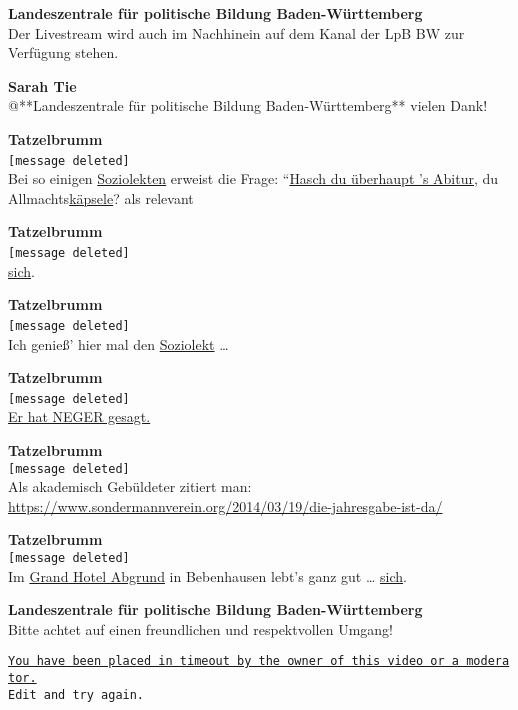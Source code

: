 \documentclass[]{article}
\begin{document}
\textbf{Landeszentrale für politische Bildung Baden-Württemberg}\\
​Der Livestream wird auch im Nachhinein auf dem Kanal der LpB BW zur
Verfügung stehen.

\textbf{Sarah Tie}\\
​@**Landeszentrale für politische Bildung Baden-Württemberg** vielen
Dank!

\textbf{Tatzelbrumm}\\
​\texttt{{[}message\ deleted{]}}\\
​Bei so einigen \protect\hyperlink{Soziolekt}{Soziolekten} erweist die
Frage: ``\protect\hyperlink{Saudaemliche-Details}{Hasch du überhaupt 's
Abitur}, du Allmachts\protect\hyperlink{Kaepsele}{käpsele}? als relevant

\textbf{Tatzelbrumm}\\
​\texttt{{[}message\ deleted{]}}\\
​\protect\hyperlink{Das-postponierte-Reflexivum}{sich}.

\textbf{Tatzelbrumm}\\
​\texttt{{[}message\ deleted{]}}\\
​Ich genieß' hier mal den \protect\hyperlink{Soziolekt}{Soziolekt}
\ldots{}

\textbf{Tatzelbrumm}\\
​\texttt{{[}message\ deleted{]}}\\
​\protect\hyperlink{Neger}{Er hat NEGER gesagt.}

\textbf{Tatzelbrumm}\\
\texttt{{[}message\ deleted{]}}\\
​​Als akademisch Gebüldeter zitiert man:\\
\protect\hyperlink{Schwuler-Fussball}{https://www.sondermannverein.org/2014/03/19/die-jahresgabe-ist-da/}

\textbf{Tatzelbrumm}\\
\texttt{{[}message\ deleted{]}}\\
Im \protect\hyperlink{Grand-Hotel-Abgrund}{Grand Hotel Abgrund} in
Bebenhausen lebt's ganz gut \ldots{}
​\protect\hyperlink{Das-postponierte-Reflexivum}{sich}.

​​\textbf{Landeszentrale für politische Bildung Baden-Württemberg}\\
​Bitte achtet auf einen freundlichen und respektvollen Umgang!

\href{https://youtu.be/jSiCjzEgx1k?t=23}{\texttt{You\ have\ been\ placed\ in\ timeout\ by\ the\ owner\ of\ this\ video\ or\ a\ moderator.}}\\
\texttt{Edit\ and\ try\ again.}
\end{document}
